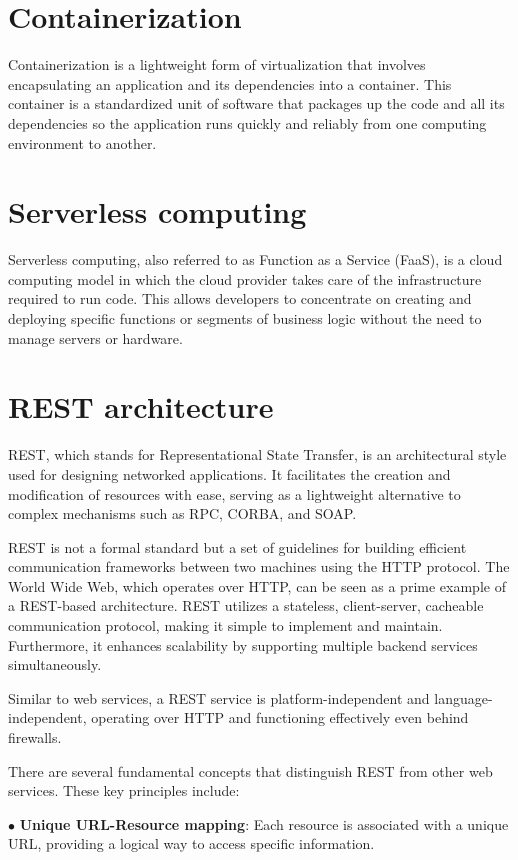 \section{ Containerization}
Containerization is a lightweight form of virtualization that involves
encapsulating an application and its dependencies into a container. 
This container is a standardized unit of software that packages up the code and all its dependencies so the application runs quickly and reliably from one computing environment to another.

\section{Serverless computing}
Serverless computing, also referred to as Function as a Service (FaaS), is a cloud computing model in which the cloud provider takes care of the infrastructure required to run code. This allows developers to concentrate on creating and deploying specific functions or segments of business logic without the need to manage servers or hardware.


\section{REST architecture}
REST, which stands for Representational State Transfer, is an architectural style used for designing networked applications. It facilitates the creation and modification of resources with ease, serving as a lightweight alternative to complex mechanisms such as RPC, CORBA, and SOAP.

REST is not a formal standard but a set of guidelines for building efficient communication frameworks between two machines using the HTTP protocol. The World Wide Web, which operates over HTTP, can be seen as a prime example of a REST-based architecture. REST utilizes a stateless, client-server, cacheable communication protocol, making it simple to implement and maintain. Furthermore, it enhances scalability by supporting multiple backend services simultaneously.

Similar to web services, a REST service is platform-independent and language-independent, operating over HTTP and functioning effectively even behind firewalls.

There are several fundamental concepts that distinguish REST from other web services. These key principles include:

$\bullet$ \textbf{Unique URL-Resource mapping}: Each resource is associated with a unique URL, providing a logical way to access specific information. 


